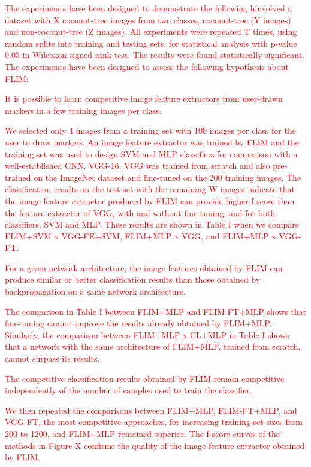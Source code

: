 \documentclass[journal, twoside]{IEEEtran}
\begin{document}
\textcolor{red}{The experiments have been designed to demonstrate the following hinvolved a dataset with X coconut-tree images from two classes, coconut-tree (Y images) and non-coconut-tree (Z images). All experiments were repeated T times, using random splits into training and testing sets, for statistical analysis with p-value 0.05 in Wilcoxon signed-rank test. The results were found statistically significant. The experiments have been designed to assess the following hypothesis about FLIM:

It is possible to learn competitive image feature extractors from user-drawn markers in a few training images per class. 

We selected only 4 images from a training set with 100 images per class for the user to draw markers. An image feature extractor was trained by FLIM and the training set was used to design SVM and MLP classifiers for comparison with a well-established CNN, VGG-16. VGG was trained from scratch and also pre-trained on the ImageNet dataset and fine-tuned on the 200 training images. The classification results on the test set with the remaining W images indicate that the image feature extractor produced by FLIM can provide higher f-score than the feature extractor of VGG, with and without fine-tuning, and for both classifiers, SVM and MLP. These results are shown in Table I when we compare FLIM+SVM x VGG-FE+SVM, FLIM+MLP x VGG, and FLIM+MLP x VGG-FT. 

For a given network architecture, the image features obtained by FLIM can produce similar or better classification results than those obtained by backpropagation on a same network architecture.

The comparison in Table I between FLIM+MLP and FLIM-FT+MLP shows that fine-tuning cannot improve the results already obtained by FLIM+MLP. Similarly, the comparison between FLIM+MLP x CL+MLP in Table I shows that a network with the same architecture of FLIM+MLP, trained from scratch, cannot surpass its results.  

The competitive classification results obtained by FLIM remain competitive independently of the number of samples used to train the classifier.

We then repeated the comparisons between FLIM+MLP, FLIM-FT+MLP, and VGG-FT, the most competitive approaches, for increasing training-set sizes from 200 to 1200, and FLIM+MLP remained superior. The f-score curves of the methods in Figure X confirms the quality of the image feature extractor obtained by FLIM.  

}
\end{document}
